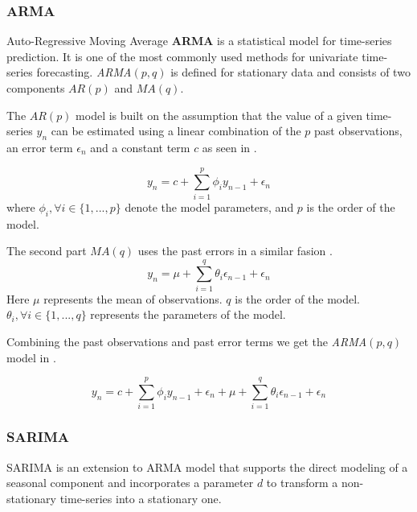 
\subsubsection{ARMA}

Auto-Regressive Moving Average \textbf{ARMA} is a statistical model for time-series prediction. It is one of the most commonly used methods for univariate time-series forecasting.
\textit{ARMA}$(p, q)$ is defined for stationary data and consists of two components $AR(p)$ and $MA(q)$.

The $AR(p)$ model is built on the assumption that the value of a given time-series $y_n$ can be estimated using a linear combination
of the $p$ past observations, an error term $\epsilon_n$ and a constant term $c$ as seen in  \citep{Box2016}.

\begin{equation}
  \label{eq:arma_ar(p)}
  y_n = c + \sum_{i=1}^{p} \phi_i y_{n-1} + \epsilon_n
\end{equation}
where $\phi_i, \forall i \in \{1, ..., p\} $ denote the model parameters, and $p$ is the order of the model.

The second part $MA(q)$ uses the past errors in a similar fasion .
\begin{equation}
  \label{eq_arma_ma(q)}
  y_n = \mu + \sum_{i=1}^{q} \theta_i \epsilon_{n-1} + \epsilon_n
\end{equation}
Here $\mu$ represents the mean of observations. $q$ is the order of the model. $\theta_i, \forall i \in \{1, ..., q\}$ represents the parameters of the model.

Combining the past observations  and past error terms  we get the \textit{ARMA}$(p,q)$ model in .

\begin{equation}
  \label{eq:arma}
  y_n = c + \sum_{i=1}^{p} \phi_i y_{n-1} + \epsilon_n + \mu + \sum_{i=1}^{q} \theta_i \epsilon_{n-1} + \epsilon_n
\end{equation}



\subsubsection{SARIMA}
SARIMA is an extension to ARMA model that supports the direct modeling of a seasonal component and incorporates a parameter $d$
to transform a non-stationary time-series into a stationary one.

